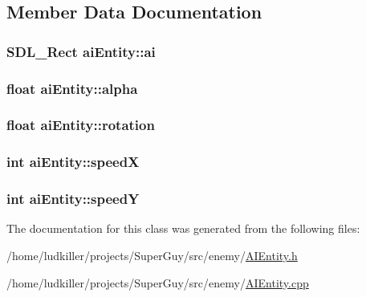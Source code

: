 \subsection{Member Data Documentation}
\hypertarget{classai_entity_a71798529cfeef539f170a810a4e2e05d}{
\subsubsection[{ai}]{\setlength{\rightskip}{0pt plus 5cm}S\-D\-L\-\_\-\-Rect ai\-Entity\-::ai}}\label{classai_entity_a71798529cfeef539f170a810a4e2e05d}
\hypertarget{classai_entity_ab10f9085050a47cd2e2d672f033260c0}{
\subsubsection[{alpha}]{\setlength{\rightskip}{0pt plus 5cm}float ai\-Entity\-::alpha}}\label{classai_entity_ab10f9085050a47cd2e2d672f033260c0}
\hypertarget{classai_entity_a00bd1c27c4f5596b6faa7b60cab4b1c1}{
\subsubsection[{rotation}]{\setlength{\rightskip}{0pt plus 5cm}float ai\-Entity\-::rotation}}\label{classai_entity_a00bd1c27c4f5596b6faa7b60cab4b1c1}
\hypertarget{classai_entity_aee66c693af00696139c2b8645f2e477a}{
\subsubsection[{speed\-X}]{\setlength{\rightskip}{0pt plus 5cm}int ai\-Entity\-::speed\-X}}\label{classai_entity_aee66c693af00696139c2b8645f2e477a}
\hypertarget{classai_entity_a2d8ad66d0365d4e73833fe85604473a3}{
\subsubsection[{speed\-Y}]{\setlength{\rightskip}{0pt plus 5cm}int ai\-Entity\-::speed\-Y}}\label{classai_entity_a2d8ad66d0365d4e73833fe85604473a3}


The documentation for this class was generated from the following files\-:\begin{DoxyCompactItemize}
\item 
/home/ludkiller/projects/\-Super\-Guy/src/enemy/\hyperlink{_a_i_entity_8h}{A\-I\-Entity.\-h}\item 
/home/ludkiller/projects/\-Super\-Guy/src/enemy/\hyperlink{_a_i_entity_8cpp}{A\-I\-Entity.\-cpp}\end{DoxyCompactItemize}
